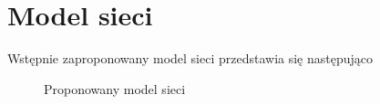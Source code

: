 \documentclass{article}
\begin{document}

\section{Model sieci}
Wstępnie zaproponowany model sieci przedstawia się następująco
\begin{figure}[H]
%
\centering
\caption{Proponowany model sieci}
\end{figure}
\end{document}
